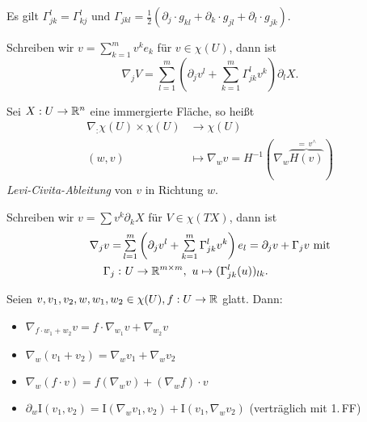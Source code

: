 \documentclass{cheat-sheet}
\newcommand{\I}{\mathrm{I}}
\let\mySum\sum
\DeclareMathOperator*{\textsum}{{\textstyle \mySum}}
\renewcommand{\sum}{\textsum\limits}
\begin{document}
\begin{satz}
    Es gilt $\Gamma_{jk}^l = \Gamma_{kj}^l \,\, \text{und} \,\, \Gamma_{jkl} = \tfrac{1}{2} (\partial_j \cdot g_{kl} + \partial_k \cdot g_{jl} + \partial_l \cdot g_{jk})$.
\end{satz}

\begin{bem}
  Schreiben wir $v = \sum_{k=1}^m v^k e_k$ für $v \in \chi(U)$, dann ist
  \[ \nabla_j V = \sum_{l=1}^m \left( \partial_j v^l + \sum_{k=1}^m \Gamma_{jk}^l v^k \right) \partial_l X. \]
\end{bem}



\begin{defn}
  Sei $X : U \to \mathbb{R}^n$ eine immergierte Fläche, so heißt
  \begin{align*}
    \nabla_ : \chi(U) \times \chi(U) &\to \chi(U) \\[-12pt]
    (w, v) &\mapsto \nabla_w v = H^{-1}(\nabla_w \overbrace{H(v)}^{=\,v^\wedge})
  \end{align*}
  \emph{Levi-Civita-Ableitung} von $v$ in Richtung $w$.
\end{defn}

\begin{bem}
  Schreiben wir $v = \sum v^k \partial_k X$ für $V \in \chi(TX)$, dann ist
  \begin{align*}
    \nabla_j v =& \sum_{l=1}^m \left( \partial_j v^l + \sum_{k=1}^m \Gamma_{jk}^l v^k \right) e_l = \partial_j v + \Gamma_j v \text{ mit}\\
    \Gamma_j :& \,\, U \to \R^{m \times m}, \,\, u \mapsto (\Gamma_{jk}^l(u))_{lk}.
  \end{align*}
\end{bem}

\begin{satz}
  Seien $v, v_1, v_2, w, w_1, w_2 \in \chi(U), f : U \to \mathbb{R}$ glatt. Dann:
  \begin{itemize}
    \item $\nabla_{f \cdot w_1 + w_2} v = f \cdot \nabla_{w_1} v + \nabla_{w_2} v$
    \item $\nabla_w (v_1 + v_2) = \nabla_w v_1 + \nabla_w v_2$
    \item $\nabla_w (f \cdot v) = f (\nabla_w v) + (\nabla_w f) \cdot v$
    \item $\partial_w \I(v_1, v_2) = \I(\nabla_w v_1, v_2) + \I(v_1, \nabla_w v_2)$ (verträglich mit 1.\,FF)
  \end{itemize}
\end{satz}
\end{document}
